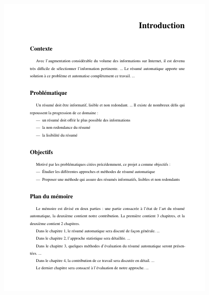 \documentclass[xcolor=table]{beamer}
\begin{document}
\begin{frame}
\begin{minipage}{0.52\textwidth}
\begin{itemize}
	\end{itemize}
\end{minipage}
\begin{minipage}{0.42\textwidth}
	\includegraphics[width=\textwidth]{..//img/Bweb03-redaction/intro.png}
\end{minipage}



\end{frame}
\end{document}
